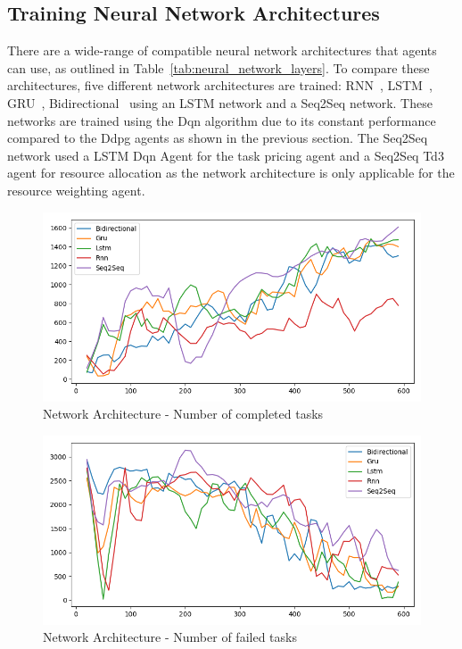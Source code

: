 \subsection{Training Neural Network Architectures}
\label{subsec:neural-network-architecture-training}
There are a wide-range of compatible neural network architectures that agents can use, as outlined in
Table~\ref{tab:neural_network_layers}. To compare these architectures, five different network architectures are trained:
RNN~\citep{RNN}, LSTM~\citep{LSTM}, GRU~\citep{GRU}, Bidirectional~\citep{Bidirectional} using an LSTM network and
a Seq2Seq network. These networks are trained using the Dqn algorithm due to its constant performance compared to the
Ddpg agents as shown in the previous section. The Seq2Seq network used a LSTM Dqn Agent for the task pricing agent and
a Seq2Seq Td3 agent for resource allocation as the network architecture is only applicable for the resource weighting
agent.

\begin{figure}[H]
    \centering
    \includegraphics[width=\linewidth]{figures/5_evaluation_figs/net_arch_training_fig/num_completed_tasks.png}
    \caption{Network Architecture - Number of completed tasks}
    \label{fig:net_arch_num_completed_tasks}
\end{figure}

\begin{figure}[H]
    \centering
    \includegraphics[width=\linewidth]{figures/5_evaluation_figs/net_arch_training_fig/num_failed_tasks.png}
    \caption{Network Architecture - Number of failed tasks}
    \label{fig:net_arch_num_failed_tasks}
\end{figure}


